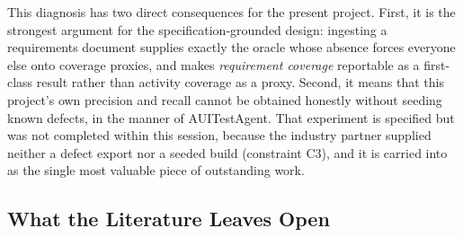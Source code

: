 This diagnosis has two direct consequences for the present project. First, it
is the strongest argument for the specification-grounded design: ingesting a
requirements document supplies exactly the oracle whose absence forces everyone
else onto coverage proxies, and makes \emph{requirement coverage} reportable as
a first-class result rather than activity coverage as a proxy. Second, it means
that this project's own precision and recall cannot be obtained honestly
without seeding known defects, in the manner of AUITestAgent. That experiment
is specified but was not completed within this session, because the industry
partner supplied neither a defect export nor a seeded build (constraint C3),
and it is carried into  as the single most valuable piece
of outstanding work.

\subsection{What the Literature Leaves Open}
\label{subsec:gaps}

